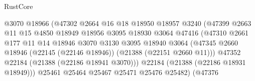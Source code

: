 \begin{lexlean}{RustCore}
\begin{coremodule}
                                          @3070
                                          @18966
                                          (@47302
                                            @2664
                                            @16
                                            @18
                                            @18950
                                            @18957
                                            @3240
                                            (@47399
                                              @2663
                                              @11
                                              @15
                                              @4850
                                              @18949
                                              @18956
                                              @3095
                                              @18930
                                              @3064
                                              @47416
                                              (@47310
                                                @2661
                                                @177
                                                @11
                                                @14
                                                @18946
                                                @3070
                                                @3130
                                                @3095
                                                @18940
                                                @3064
                                                (@47345
                                                  @2660
                                                  @18946
                                                  (@22145 (@22146 @18946))
                                                  (@21388 (@22151 @2660 @11)))
                                                @47352
                                                @22184
                                                (@21388 (@22186 @18941 @3070)))
                                              @22184
                                              (@21388 (@22186 @18931 @18949)))
                                            @25461
                                            @25464
                                            @25467
                                            @25471
                                            @25476
                                            @25482)
                                          (@47376

\end{coremodule}
\end{lexlean}
